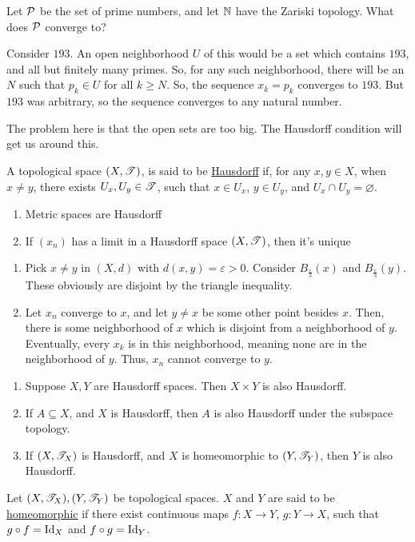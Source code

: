 \documentclass[x11names,reqno,14pt]{extarticle}
\begin{document}
\exm

Let $\mathcal{P}$ be the set of prime numbers, and let $\mathbb{N}$ have the Zariski topology. What does $\mathcal{P}$ converge to? 

Consider $193$. An open neighborhood $U$ of this would be a set which contains $193$, and all but finitely many primes. So, for any such neighborhood, there will be an $N$ such that $p_k \in U$ for all $k \geq N$. So, the sequence $x_k = p_k$ converges to $193$. But $193$ was arbitrary, so the sequence converges to any natural number. 

The problem here is that the open sets are too big. The Hausdorff condition will get us around this. 


A topological space $(X, \mathscr{T})$, is said to be \underline{Hausdorff} if, for any $x, y \in X$, when $x \neq y$, there exists $U_x, U_y \in \mathscr{T}$, such that $x \in U_x$, $y \in U_y$, and $U_x \cap U_y = \varnothing$. 

\lem


\begin{enumerate}[label=(\alph*)]
\item Metric spaces are Hausdorff
\item If $(x_n)$ has a limit in a Hausdorff space $(X, \mathscr{T})$, then it's unique 
\end{enumerate}

\proof
\begin{enumerate}[label=(\alph*)]
\item Pick $x \neq y$ in $(X, d)$ with $d(x, y) = \varepsilon>0$. Consider $B_{\frac{\varepsilon}{3}}(x)$ and $B_{\frac{\varepsilon}{3}}(y)$. These obviously are disjoint by the triangle inequality.
\item Let $x_n$ converge to $x$, and let $y \neq x$ be some other point besides $x$. Then, there is some neighborhood of $x$ which is disjoint from a neighborhood of $y$. Eventually, every $x_k$ is in this neighborhood, meaning none are in the neighborhood of $y$. Thus, $x_n$ cannot converge to $y$.  
\end{enumerate}

\thm

\begin{enumerate}[label = (\alph*)]
\item Suppose $X, Y$ are Hausdorff spaces. Then $X\times Y$ is also Hausdorff. 
\item If $A \subseteq X$, and $X$ is Hausdorff, then $A$ is also Hausdorff under the subspace topology. 
\item If $(X, \mathscr{T}_X)$ is Hausdorff, and $X$ is homeomorphic to $(Y, \mathscr{T}_Y)$, then $Y$ is also Hausdorff. 
\end{enumerate}


Let $(X, \mathscr{T}_X), (Y, \mathscr{T}_Y)$ be topological spaces. $X$ and $Y$ are said to be \underline{homeomorphic} if there exist continuous maps $f:X\to Y$, $g:Y\to X$, such that $g \circ f = \operatorname{\mathrm{Id}}_X$ and $f \circ g = \operatorname{\mathrm{Id}}_Y$.
\end{document}
